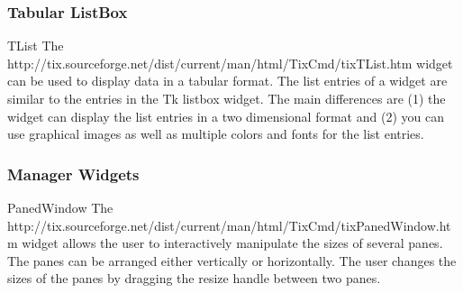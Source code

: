 


\subsubsection{Tabular ListBox}

\begin{classdesc}{TList}{}
The 
{http://tix.sourceforge.net/dist/current/man/html/TixCmd/tixTList.htm}
widget can be used to display data in a tabular format. The list
entries of a  widget are similar to the entries in the Tk
listbox widget.  The main differences are (1) the  widget
can display the list entries in a two dimensional format and (2) you
can use graphical images as well as multiple colors and fonts for the
list entries.
\end{classdesc}




\subsubsection{Manager Widgets}

\begin{classdesc}{PanedWindow}{}
The 
{http://tix.sourceforge.net/dist/current/man/html/TixCmd/tixPanedWindow.htm}
widget allows the user to interactively manipulate the sizes of
several panes.  The panes can be arranged either vertically or
horizontally.  The user changes the sizes of the panes by dragging the
resize handle between two panes.
\end{classdesc}

